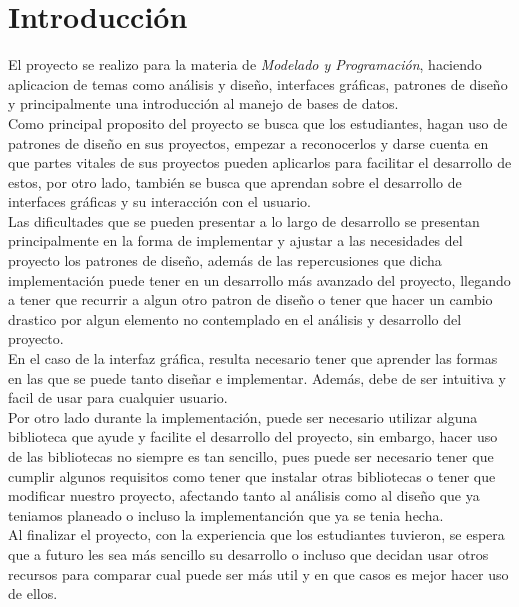\documentclass[12pt]{report}
\begin{document}
\chapter{Introducción}
El proyecto se realizo para la materia de \textit{Modelado y Programación}, haciendo aplicacion de temas como análisis y diseño, interfaces gráficas, patrones de diseño y principalmente una introducción al manejo de bases de datos.\\

Como principal proposito del proyecto se busca que los estudiantes, hagan uso de patrones de diseño en sus proyectos, empezar a reconocerlos y darse cuenta en que partes vitales de sus proyectos pueden aplicarlos para facilitar el desarrollo de estos, por otro lado, también se busca que aprendan sobre el desarrollo de interfaces gráficas y su interacción con el usuario.\\

Las dificultades que se pueden presentar a lo largo de desarrollo se presentan principalmente en la forma de implementar y ajustar a las necesidades del proyecto los patrones de diseño, además de las repercusiones que dicha implementación puede tener en un desarrollo más avanzado del proyecto, llegando a tener que recurrir a algun otro patron de diseño o tener que hacer un cambio drastico por algun elemento no contemplado en el análisis y desarrollo del proyecto.\\

En el caso de la interfaz gráfica, resulta necesario tener que aprender las formas en las que se puede tanto diseñar e implementar. Además, debe de ser intuitiva y facil de usar para cualquier usuario.\\

Por otro lado durante la implementación, puede ser necesario utilizar alguna biblioteca que ayude y facilite el desarrollo del proyecto, sin embargo, hacer uso de las bibliotecas no siempre es tan sencillo, pues puede ser necesario tener que cumplir algunos requisitos como tener que instalar otras bibliotecas o tener que modificar nuestro proyecto, afectando tanto al análisis como al diseño que ya teniamos planeado o incluso la implementanción que ya se tenia hecha.\\

Al finalizar el proyecto, con la experiencia que los estudiantes tuvieron, se espera que a futuro les sea más sencillo su desarrollo o incluso que decidan usar otros recursos para comparar cual puede ser más util y en que casos es mejor hacer uso de ellos.\\
\end{document}
